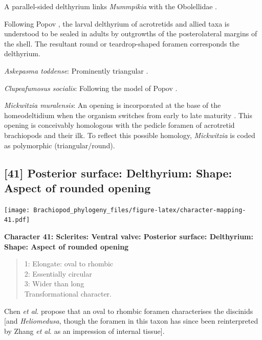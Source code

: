 \documentclass[openany]{book}
\theoremstyle{definition}
\theoremstyle{definition}
\theoremstyle{definition}
\theoremstyle{remark}
\begin{document}
A parallel-sided delthyrium links \emph{Mummpikia} with the Obolellidae
\citep{Balthasar2008iMummpikia}.

Following Popov \citeyearpar{Popov1992TheCambrian}, the larval
delthyrium of acrotretids and allied taxa is understood to be sealed in
adults by outgrowths of the posterolateral margins of the shell. The
resultant round or teardrop-shaped foramen corresponds the delthyrium.

\emph{Askepasma toddense}: Prominently triangular \citep[see][fig.
2]{Topper2013Theoldest}.

\emph{Clupeafumosus socialis}: Following the model of Popov
\citeyearpar{Popov1992TheCambrian}.

\emph{Mickwitzia muralensis}: An opening is incorporated at the base of
the homeodeltidium when the organism switches from early to late
maturity \citep[fig. 10 in][]{Balthasar2004Shellstructure}. This opening
is conceivably homologous with the pedicle foramen of acrotretid
brachiopods and their ilk. To reflect this possible homology,
\emph{Mickwitzia} is coded as polymorphic (triangular/round).

\hypertarget{posterior-surface-delthyrium-shape-aspect-of-rounded-opening}{%
\subsection*{{[}41{]} Posterior surface: Delthyrium: Shape: Aspect of
rounded
opening}\label{posterior-surface-delthyrium-shape-aspect-of-rounded-opening}}

\texttt{[image: Brachiopod\_phylogeny\_files/figure-latex/character-mapping-41.pdf]}

\textbf{Character 41: Sclerites: Ventral valve: Posterior surface:
Delthyrium: Shape: Aspect of rounded opening}

\begin{quote}
1: Elongate: oval to rhombic\\
2: Essentially circular\\
3: Wider than long\\
Transformational character.
\end{quote}

Chen \emph{et al}. \citeyearpar{Chen2007Reinterpretationof} propose that
an oval to rhombic foramen characterises the discinids {[}and
\emph{Heliomedusa}, though the foramen in this taxon has since been
reinterpreted by Zhang \emph{et al}.
\citeyearpar{Zhang2009Architectureand} as an impression of internal
tissue{]}.
\end{document}
